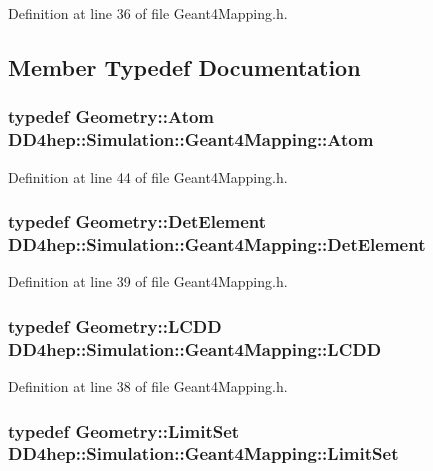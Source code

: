 Definition at line 36 of file Geant4Mapping.h.

\subsection{Member Typedef Documentation}
\hypertarget{class_d_d4hep_1_1_simulation_1_1_geant4_mapping_aa33a3f44904c6184ee883c244baa9554}{
\subsubsection[{Atom}]{\setlength{\rightskip}{0pt plus 5cm}typedef {\bf Geometry::Atom} {\bf DD4hep::Simulation::Geant4Mapping::Atom}}}
\label{class_d_d4hep_1_1_simulation_1_1_geant4_mapping_aa33a3f44904c6184ee883c244baa9554}


Definition at line 44 of file Geant4Mapping.h.\hypertarget{class_d_d4hep_1_1_simulation_1_1_geant4_mapping_a58a1cf6fc60a0928c1048fb1d32fcea5}{
\subsubsection[{DetElement}]{\setlength{\rightskip}{0pt plus 5cm}typedef {\bf Geometry::DetElement} {\bf DD4hep::Simulation::Geant4Mapping::DetElement}}}
\label{class_d_d4hep_1_1_simulation_1_1_geant4_mapping_a58a1cf6fc60a0928c1048fb1d32fcea5}


Definition at line 39 of file Geant4Mapping.h.\hypertarget{class_d_d4hep_1_1_simulation_1_1_geant4_mapping_a7b098323f9ea570a13d220fe3f09da41}{
\subsubsection[{LCDD}]{\setlength{\rightskip}{0pt plus 5cm}typedef {\bf Geometry::LCDD} {\bf DD4hep::Simulation::Geant4Mapping::LCDD}}}
\label{class_d_d4hep_1_1_simulation_1_1_geant4_mapping_a7b098323f9ea570a13d220fe3f09da41}


Definition at line 38 of file Geant4Mapping.h.\hypertarget{class_d_d4hep_1_1_simulation_1_1_geant4_mapping_a274f93e912e70a162849adb21f54184e}{
\subsubsection[{LimitSet}]{\setlength{\rightskip}{0pt plus 5cm}typedef {\bf Geometry::LimitSet} {\bf DD4hep::Simulation::Geant4Mapping::LimitSet}}}
\label{class_d_d4hep_1_1_simulation_1_1_geant4_mapping_a274f93e912e70a162849adb21f54184e}


